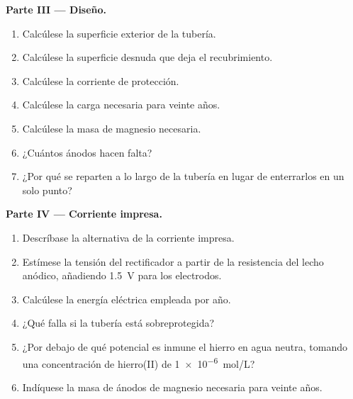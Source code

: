 \begin{problem}
\medskip
\noindent\textbf{Parte III --- Diseño.}
\begin{enumerate}[resume]
  \item Calcúlese la superficie exterior de la tubería.
  \item Calcúlese la superficie desnuda que deja el recubrimiento.
  \item Calcúlese la corriente de protección.
  \item Calcúlese la carga necesaria para veinte años.
  \item Calcúlese la masa de magnesio necesaria.
  \item ¿Cuántos ánodos hacen falta?
  \item ¿Por qué se reparten a lo largo de la tubería en lugar de enterrarlos en un
        solo punto?
\end{enumerate}

\medskip
\noindent\textbf{Parte IV --- Corriente impresa.}
\begin{enumerate}[resume]
  \item Descríbase la alternativa de la corriente impresa.
  \item Estímese la tensión del rectificador a partir de la resistencia del lecho anódico,
        añadiendo \qty{1.5}{V} para los electrodos.
  \item Calcúlese la energía eléctrica empleada por año.
  \item ¿Qué falla si la tubería está sobreprotegida?
  \item ¿Por debajo de qué potencial es inmune el hierro en agua neutra, tomando una
        concentración de hierro(II) de \qty{1e-6}{mol/L}?
  \item Indíquese la masa de ánodos de magnesio necesaria para veinte años.
\end{enumerate}
\end{problem}
